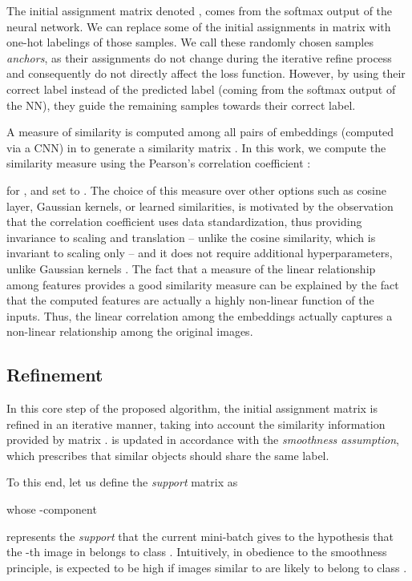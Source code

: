 \documentclass[runningheads]{llncs}
\begin{document}
 The initial assignment matrix denoted , comes from the softmax output of the neural network. 
We can replace some of the initial assignments in matrix  with one-hot labelings of those samples. We call these randomly chosen samples {\it anchors}, as their assignments do not change during the iterative refine process and consequently do not directly affect the loss function. However, by using their correct label instead of the predicted label (coming from the softmax output of the NN), they guide the remaining samples towards their correct label. 




 A measure of similarity is computed among all pairs of embeddings (computed via a CNN) in  to generate a similarity matrix . 
In this work, we compute the similarity measure using the Pearson's correlation coefficient \cite{DBLP:journals/rsl/Pearson95}:
 
for , and set  to .
The choice of this measure over other options such as cosine layer, Gaussian kernels, or learned similarities, is motivated by the observation that the correlation coefficient uses data standardization, thus providing invariance to scaling and translation -- unlike the cosine similarity, which is invariant to scaling only -- and it does not require additional hyperparameters, unlike Gaussian kernels \cite{DBLP:conf/icpr/EleziTVP18}. 
The fact that a measure of the linear relationship among features provides a good similarity measure can be explained by the fact that the computed features are actually a highly non-linear function of the inputs. Thus, the linear correlation among the embeddings actually captures a non-linear relationship among the original images. 


\subsection{Refinement}
In this core step of the proposed algorithm, the initial assignment matrix  is refined in an iterative manner, taking into account the similarity information provided by matrix .  is updated in accordance with the \emph{smoothness assumption}, which prescribes that similar objects should share the same label.

To this end, let us define the \emph{support} matrix  as

whose -component

represents the \emph{support} that the current mini-batch gives to the hypothesis that the -th image in  belongs to class . Intuitively, in obedience to the smoothness principle,   is expected to be high if images similar to  are likely to belong to class .
\end{document}
